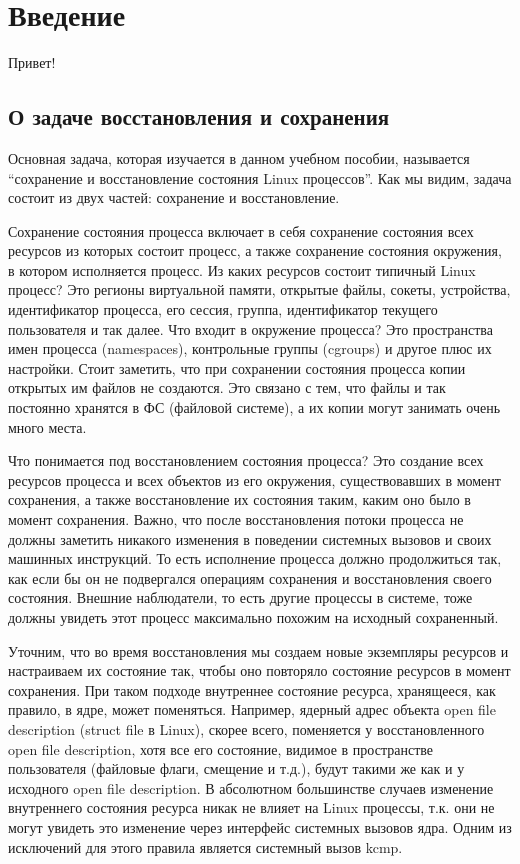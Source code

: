 \chapter{Введение}


Привет!

\section{О задаче восстановления и сохранения}
 
Основная задача, которая изучается в данном учебном пособии, называется “сохранение и восстановление состояния Linux процессов”. Как мы видим, задача состоит из двух частей: сохранение и восстановление.
 
Сохранение состояния процесса включает в себя сохранение состояния всех ресурсов из которых состоит процесс, а также сохранение состояния окружения, в котором исполняется процесс. Из каких ресурсов состоит типичный Linux процесс? Это регионы виртуальной памяти, открытые файлы, сокеты, устройства, идентификатор процесса, его сессия, группа, идентификатор текущего пользователя и так далее. Что входит в окружение процесса? Это пространства имен процесса (namespaces), контрольные группы (cgroups) и другое плюс их настройки. Стоит заметить, что при сохранении состояния процесса копии открытых им файлов не создаются. Это связано с тем, что файлы и так постоянно хранятся в ФС (файловой системе), а их копии могут занимать очень много места.
 
Что понимается под восстановлением состояния процесса? Это создание всех ресурсов процесса и всех объектов из его окружения, существовавших в момент сохранения, а также восстановление их состояния таким, каким оно было в момент сохранения. Важно, что после восстановления потоки процесса не должны заметить никакого изменения в поведении системных вызовов и своих машинных инструкций. То есть исполнение процесса должно продолжиться так, как если бы он не подвергался операциям сохранения и восстановления своего состояния. Внешние наблюдатели, то есть другие процессы в системе, тоже должны увидеть этот процесс максимально похожим на исходный сохраненный.
 
Уточним, что во время восстановления мы создаем новые экземпляры ресурсов и настраиваем их состояние так, чтобы оно повторяло состояние ресурсов в момент сохранения. При таком подходе внутреннее состояние ресурса, хранящееся, как правило, в ядре, может поменяться. Например, ядерный адрес объекта open file description (struct file в Linux), скорее всего, поменяется у восстановленного open file description, хотя все его состояние, видимое в пространстве пользователя (файловые флаги, смещение и т.д.), будут такими же как и у исходного open file description. В абсолютном большинстве случаев изменение внутреннего состояния ресурса никак не влияет на Linux процессы, т.к. они не могут увидеть это изменение через интерфейс системных вызовов ядра. Одним из исключений для этого правила является системный вызов kcmp.

